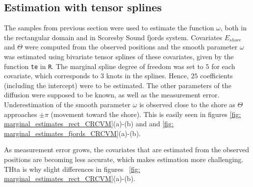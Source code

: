 \documentclass[11pt]{article}
\newcommand {\1}{\mathbb{1}}
\begin{document}
\subsection{Estimation with tensor splines}


The samples from previous section were used to estimate the function $\omega$, both in the rectangular domain and in Scoresby Sound fjords system. Covariates $E_{shore}$ and $\Theta$ were computed from the observed positions and the smooth parameter $\omega$ was estimated using bivariate tensor splines of these covariates, given by the function \texttt{te} in \texttt{R}. The marginal spline degree of freedom was set to $5$ for each covariate, which corresponds to $3$ knots in the splines. Hence, $25$ coefficients (including the intercept) were to be estimated. The other parameters of the diffusion were supposed to be known, as well as the measurement error. Underestimation of the smooth parameter $\omega$ is observed close to the shore as $\Theta$ approaches $\pm \pi$ (movement toward the shore). This is easily seen in figures \ref{fig: marginal_estimates_rect_CRCVM}(a)-(b) and and \ref{fig: marginal_estimates_fjords_CRCVM}(a)-(b).


As measurement error grows, the covariates that are estimated from the observed positions are becoming less accurate, which makes estimation more challenging. THta is why slight differences in figures ~\ref{fig: marginal_estimates_rect_CRCVM}(a)-(b).
\end{document}
